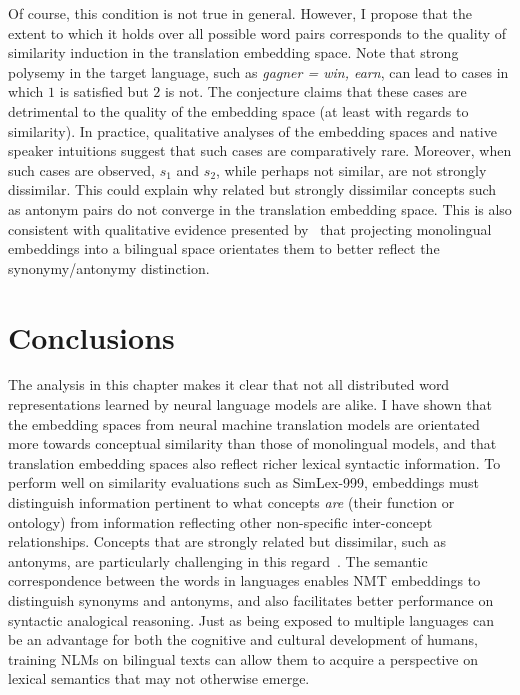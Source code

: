 
Of course, this condition is not true in general. However, I propose that the extent to which it holds over all possible word pairs corresponds to the quality of similarity induction in the translation embedding space. Note that strong polysemy in the target language, such as \emph{gagner = win, earn}, can lead to cases in which \(1\) is satisfied but \(2\) is not. The conjecture claims that these cases are detrimental to the quality of the embedding space (at least with regards to similarity). In practice, qualitative analyses of the embedding spaces and native speaker intuitions suggest that such cases are comparatively rare. Moreover, when such cases are observed, \(s_1\) and \(s_2\), while perhaps not similar, are not strongly dissimilar. This could explain why related but strongly dissimilar concepts such as antonym pairs do not converge in the translation embedding space. This is also consistent with qualitative evidence presented by~\cite{faruqui2014improving} that projecting monolingual embeddings into a bilingual space orientates them to better reflect the synonymy/antonymy distinction.
    

\section{Conclusions}

The analysis in this chapter makes it clear that not all distributed word representations learned by neural language models are alike. I have shown that the embedding spaces from neural machine translation models are orientated more towards conceptual similarity than those of monolingual models, and that translation embedding spaces also reflect richer lexical syntactic information. To perform well on similarity evaluations such as SimLex-999, embeddings must distinguish information pertinent to what concepts \emph{are} (their function or ontology) from information reflecting other non-specific inter-concept relationships. Concepts that are strongly related but dissimilar, such as antonyms, are particularly challenging in this regard~\citep{hill2014simlex}. The semantic correspondence between the words in languages enables NMT embeddings to distinguish synonyms and antonyms, and also facilitates better performance on syntactic analogical reasoning. Just as being exposed to multiple languages can be an advantage for both the cognitive and cultural development of humans, training NLMs on bilingual texts can allow them to acquire a perspective on lexical semantics that may not otherwise emerge.

